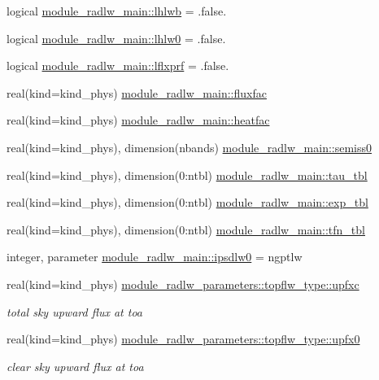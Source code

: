 \begin{DoxyCompactItemize}
\item 
logical \hyperlink{group__module__radlw__main_ga40b8a6f612a53e0a768cf922aa6f73c3}{module\+\_\+radlw\+\_\+main\+::lhlwb} = .false.
\item 
logical \hyperlink{group__module__radlw__main_ga7f8818436b81efe586d83b2f03b1617f}{module\+\_\+radlw\+\_\+main\+::lhlw0} = .false.
\item 
logical \hyperlink{group__module__radlw__main_gaec461dc1a50b326daa15c57c7dc55602}{module\+\_\+radlw\+\_\+main\+::lflxprf} = .false.
\item 
real(kind=kind\+\_\+phys) \hyperlink{group__module__radlw__main_ga3c31da677e01139d9a3f1e0795a0b614}{module\+\_\+radlw\+\_\+main\+::fluxfac}
\item 
real(kind=kind\+\_\+phys) \hyperlink{group__module__radlw__main_ga75ff8e29e21f0d07684d4a09c744daec}{module\+\_\+radlw\+\_\+main\+::heatfac}
\item 
real(kind=kind\+\_\+phys), dimension(nbands) \hyperlink{group__module__radlw__main_gae3b32aa685e5f07a0003c5e919d22996}{module\+\_\+radlw\+\_\+main\+::semiss0}
\item 
real(kind=kind\+\_\+phys), dimension(0\+:ntbl) \hyperlink{group__module__radlw__main_ga9f73814ee0b1840d8c546ef341645f43}{module\+\_\+radlw\+\_\+main\+::tau\+\_\+tbl}
\item 
real(kind=kind\+\_\+phys), dimension(0\+:ntbl) \hyperlink{group__module__radlw__main_gac2f240a927351a68fc9063321a307891}{module\+\_\+radlw\+\_\+main\+::exp\+\_\+tbl}
\item 
real(kind=kind\+\_\+phys), dimension(0\+:ntbl) \hyperlink{group__module__radlw__main_ga71dcfb3c365280e100e180fd1ce939ad}{module\+\_\+radlw\+\_\+main\+::tfn\+\_\+tbl}
\item 
integer, parameter \hyperlink{group__module__radlw__main_ga9b634a4f7b06ffdd919de69a165edadc}{module\+\_\+radlw\+\_\+main\+::ipsdlw0} = ngptlw
\item 
real(kind=kind\+\_\+phys) \hyperlink{group__module__radlw__main_ga19ff2669a279a1db869766c0e3d88981}{module\+\_\+radlw\+\_\+parameters\+::topflw\+\_\+type\+::upfxc}
\begin{DoxyCompactList}\small\item\em total sky upward flux at toa \end{DoxyCompactList}\item 
real(kind=kind\+\_\+phys) \hyperlink{group__module__radlw__main_ga7080fda1f732474077aeb302b57351cb}{module\+\_\+radlw\+\_\+parameters\+::topflw\+\_\+type\+::upfx0}
\begin{DoxyCompactList}\small\item\em clear sky upward flux at toa \end{DoxyCompactList}\item 

\end{DoxyCompactItemize}
